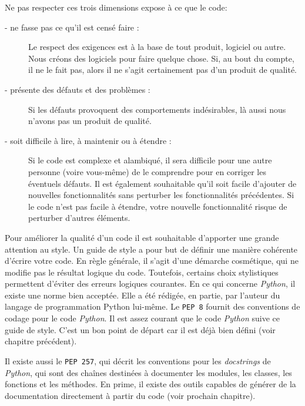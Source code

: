 \documentclass[a4paper,12pt]{book}
\begin{document}
Ne pas respecter ces trois dimensions expose à ce que le code:
\begin{description}
	\item[- ne fasse pas ce qu'il est censé faire :] Le respect des exigences est à la base de tout produit, logiciel ou autre. Nous créons des logiciels pour faire quelque chose. Si, au bout du compte, il ne le fait pas, alors il ne s'agit certainement pas d'un produit de qualité.
	\item[- présente des défauts et des problèmes :] Si les défauts provoquent des comportements indésirables, là aussi nous n'avons pas un produit de qualité.
	\item[- soit difficile à lire, à maintenir ou à étendre :] Si le code est complexe et alambiqué, il sera difficile pour une autre personne (voire vous-même) de le comprendre pour en corriger les éventuels défauts.
Il est également souhaitable qu'il soit facile d'ajouter de nouvelles fonctionnalités sans perturber les fonctionnalités précédentes. Si le code n'est pas facile à étendre, votre nouvelle fonctionnalité risque de perturber d'autres éléments.
\end{description}
\medskip

Pour améliorer la qualité d'un code il est souhaitable d'apporter une grande attention au style. Un guide de style a pour but de définir une manière cohérente d'écrire votre code. En règle générale, il s'agit d'une démarche cosmétique, qui ne modifie pas le résultat logique du code. Toutefois, certains choix stylistiques permettent d'éviter des erreurs logiques courantes.
En ce qui concerne \textit{Python}, il existe une norme bien acceptée. Elle a été rédigée, en partie, par l'auteur du langage de programmation Python lui-même. Le \texttt{PEP 8} fournit des conventions de codage pour le code \textit{Python}. Il est assez courant que le code \textit{Python} suive ce guide de style. C'est un bon point de départ car il est déjà bien défini (voir chapitre précédent).
\medskip

Il existe aussi le \texttt{PEP 257}, qui décrit les conventions pour les \textit{docstrings} de \textit{Python}, qui sont des chaînes destinées à documenter les modules, les classes, les fonctions et les méthodes. En prime, il existe des outils capables de générer de la documentation directement à partir du code (voir prochain chapitre).
\medskip
\end{document}
